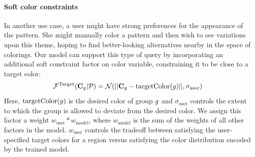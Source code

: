 \paragraph{Soft color constraints}

In another use case, a user might have strong preferences for the appearance of the pattern. She might manually color a pattern and then wish to see variations upon this theme, hoping to find better-looking alternatives nearby in the space of colorings. Our model can support this type of query by incorporating an additional soft constraint factor on color variable, constraining it to be close to a target color:
\begin{equation}
\mathcal{F}^\textrm{Target}(\mathbf{C}_g | \mathcal{P}) = \mathcal{N}(||\mathbf{C}_g - \textrm{targetColor}(g)||, \sigma_\textrm{user})
\label{eq:targetFactor}
\end{equation}
Here, $\textrm{targetColor}(g)$ is the desired color of group $g$ and $\sigma_\textrm{user}$ controls the extent to which the group is allowed to deviate from the desired color. We assign this factor a weight $w_\textrm{user} * w_\textrm{model}$, where $w_\textrm{model}$ is the sum of the weights of all other factors in the model. $w_\textrm{user}$ controls the tradeoff between satisfying the user-specified target colors for a region versus satisfying the color distribution encoded by the trained model.
%


